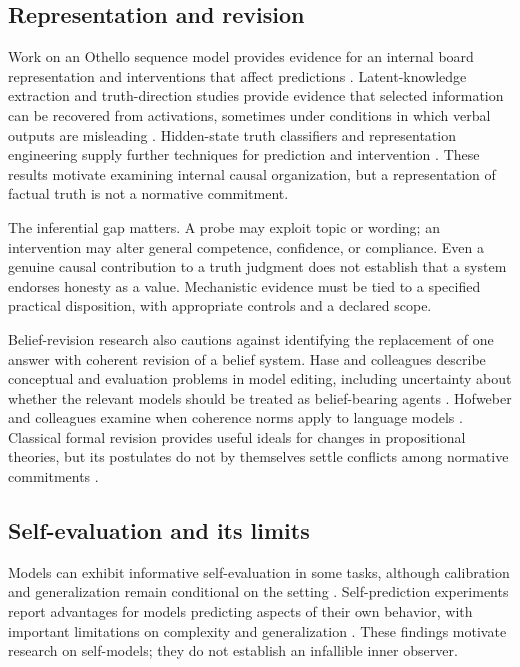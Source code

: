 \documentclass[11pt]{article}
\begin{document}
\subsection{Representation and revision}

Work on an Othello sequence model provides evidence for an internal board representation and interventions that affect predictions \cite{Li2023}. Latent-knowledge extraction and truth-direction studies provide evidence that selected information can be recovered from activations, sometimes under conditions in which verbal outputs are misleading \cite{Burns2023,Marks2024}. Hidden-state truth classifiers and representation engineering supply further techniques for prediction and intervention \cite{Azaria2023,Zou2023}. These results motivate examining internal causal organization, but a representation of factual truth is not a normative commitment.

The inferential gap matters. A probe may exploit topic or wording; an intervention may alter general competence, confidence, or compliance. Even a genuine causal contribution to a truth judgment does not establish that a system endorses honesty as a value. Mechanistic evidence must be tied to a specified practical disposition, with appropriate controls and a declared scope.

Belief-revision research also cautions against identifying the replacement of one answer with coherent revision of a belief system. Hase and colleagues describe conceptual and evaluation problems in model editing, including uncertainty about whether the relevant models should be treated as belief-bearing agents \cite{ModelEditing2024}. Hofweber and colleagues examine when coherence norms apply to language models \cite{Rationality2024}. Classical formal revision provides useful ideals for changes in propositional theories, but its postulates do not by themselves settle conflicts among normative commitments \cite{AGM1985}.

\subsection{Self-evaluation and its limits}

Models can exhibit informative self-evaluation in some tasks, although calibration and generalization remain conditional on the setting \cite{Kadavath2022}. Self-prediction experiments report advantages for models predicting aspects of their own behavior, with important limitations on complexity and generalization \cite{LookingInward2024}. These findings motivate research on self-models; they do not establish an infallible inner observer.
\end{document}
